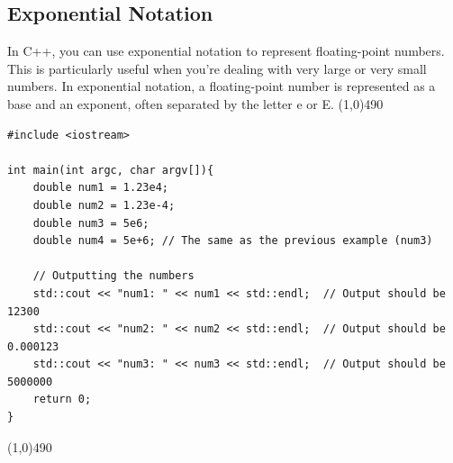 \documentclass{report}
\begin{document}
    \subsection{Exponential Notation}
    \bigbreak \noindent 
    In C++, you can use exponential notation to represent floating-point numbers. This is particularly useful when you're dealing with very large or very small numbers. In exponential notation, a floating-point number is represented as a base and an exponent, often separated by the letter e or E.
    \bigbreak \noindent 
    \line(1,0){490}
    \begin{verbatim}
#include <iostream>

int main(int argc, char argv[]){
    double num1 = 1.23e4;
    double num2 = 1.23e-4;
    double num3 = 5e6;
    double num4 = 5e+6; // The same as the previous example (num3)

    // Outputting the numbers
    std::cout << "num1: " << num1 << std::endl;  // Output should be 12300
    std::cout << "num2: " << num2 << std::endl;  // Output should be 0.000123
    std::cout << "num3: " << num3 << std::endl;  // Output should be 5000000
    return 0;
}
    \end{verbatim}
    \line(1,0){490}
    \bigbreak \noindent 
    \bigbreak \noindent 
%
%
%
%

    \bigbreak \noindent   
\end{document}
